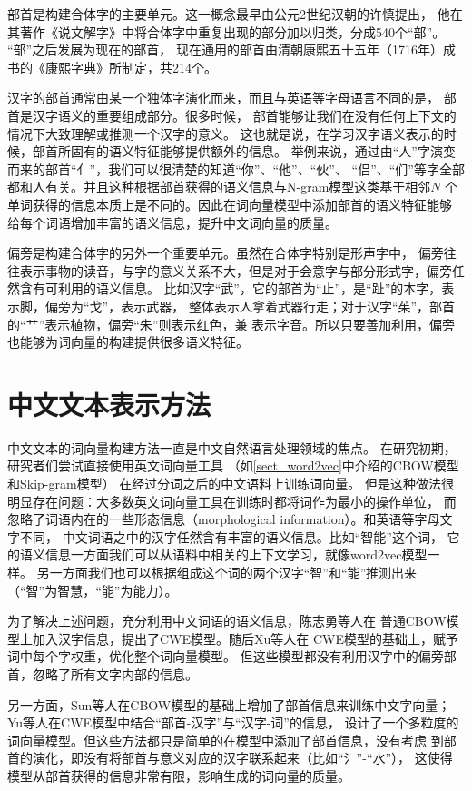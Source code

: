 部首是构建合体字的主要单元。这一概念最早由公元2世纪汉朝的许慎提出，
他在其著作《说文解字》中将合体字中重复出现的部分加以归类，分成540个“部”。
“部”之后发展为现在的部首，
现在通用的部首由清朝康熙五十五年（1716年）成书的《康熙字典》所制定，共214个。

汉字的部首通常由某一个独体字演化而来，而且与英语等字母语言不同的是，
部首是汉字语义的重要组成部分。很多时候，
部首能够让我们在没有任何上下文的情况下大致理解或推测一个汉字的意义。
这也就是说，在学习汉字语义表示的时候，部首所固有的语义特征能够提供额外的信息。
举例来说，通过由“人”字演变而来的部首“亻”，我们可以很清楚的知道“你”、“他”、“伙”、
“侣”、“们”等字全部都和人有关。并且这种根据部首获得的语义信息与N-gram模型这类基于相邻$N$
个单词获得的信息本质上是不同的。因此在词向量模型中添加部首的语义特征能够
给每个词语增加丰富的语义信息，提升中文词向量的质量。

偏旁是构建合体字的另外一个重要单元。虽然在合体字特别是形声字中，
偏旁往往表示事物的读音，与字的意义关系不大，但是对于会意字与部分形式字，偏旁任然含有可利用的语义信息。
比如汉字“武”，它的部首为“止”，是“趾”的本字，表示脚，偏旁为“戈”，表示武器，
整体表示人拿着武器行走；对于汉字“茱”，部首的“艹”表示植物，偏旁“朱”则表示红色，兼
表示字音。所以只要善加利用，偏旁也能够为词向量的构建提供很多语义特征。

\section{中文文本表示方法}
\label{word_vec_model}
中文文本的词向量构建方法一直是中文自然语言处理领域的焦点。
在研究初期，研究者们尝试直接使用英文词向量工具
（如\ref{sect_word2vec}中介绍的CBOW模型和Skip-gram模型）
在经过分词之后的中文语料上训练词向量。
但是这种做法很明显存在问题：大多数英文词向量工具在训练时都将词作为最小的操作单位，
而忽略了词语内在的一些形态信息（morphological information）。和英语等字母文字不同，
中文词语之中的汉字任然含有丰富的语义信息。比如“智能”这个词，
它的语义信息一方面我们可以从语料中相关的上下文学习，就像word2vec模型一样。
另一方面我们也可以根据组成这个词的两个汉字“智”和“能”推测出来（“智”为智慧，“能”为能力）。

为了解决上述问题，充分利用中文词语的语义信息，陈志勇等人在
普通CBOW模型上加入汉字信息，提出了CWE模型。随后Xu等人在
CWE模型的基础上，赋予词中每个字权重，优化整个词向量模型。
但这些模型都没有利用汉字中的偏旁部首，忽略了所有文字内部的信息。

另一方面，Sun等人在CBOW模型的基础上增加了部首信息来训练中文字向量；
Yu等人在CWE模型中结合“部首-汉字”与“汉字-词”的信息，
设计了一个多粒度的词向量模型。但这些方法都只是简单的在模型中添加了部首信息，没有考虑
到部首的演化，即没有将部首与意义对应的汉字联系起来（比如“氵”-“水”），
这使得模型从部首获得的信息非常有限，影响生成的词向量的质量。


